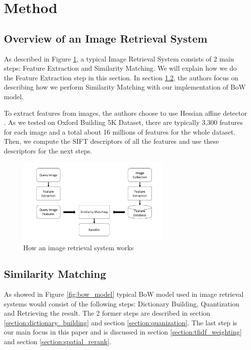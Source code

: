 \documentclass[10pt,conference,]{IEEEtran}
\begin{document}
\section{Method} \label{section:method}
\subsection{Overview of an Image Retrieval System}

As described in Figure \ref{fig:image_retrieval_system}, a typical Image Retrieval System consists of 2 main steps: Feature Extraction and Similarity Matching. We will explain how we do the Feature Extraction step in this section. In section \ref{section:similarity_extraction}, the authors focus on describing how we perform Similarity Matching with our implementation of BoW model.

To extract features from images, the authors choose to use Hessian affine detector \cite{Mikolajczyk2004}. As we tested on Oxford Building 5K Dataset, there are typically 3,300 features for each image and a total about 16 millions of features for the whole dataset. Then, we compute the SIFT descriptors \cite{Lowe2004} of all the features and use these descriptors for the next steps.

\begin{figure}
    \centering
    \includegraphics[width=3.0in]{ImageRetrievalSystem.pdf}
    \caption{How an image retrieval system works}
    \label{fig:image_retrieval_system}
\end{figure}

\subsection {Similarity Matching} \label{section:similarity_extraction}

As showed in Figure \ref{fig:bow_model} typical BoW model used in image retrieval systems would consist of the following steps: Dictionary Building, Quantization and Retrieving the result. The 2 former steps are described in section \ref{section:dictionary_building} and section \ref{section:quanization}. The last step is our main focus in this paper and is discussed in section \ref{section:tfidf_weighting} and section \ref{section:spatial_rerank}.
\end{document}

